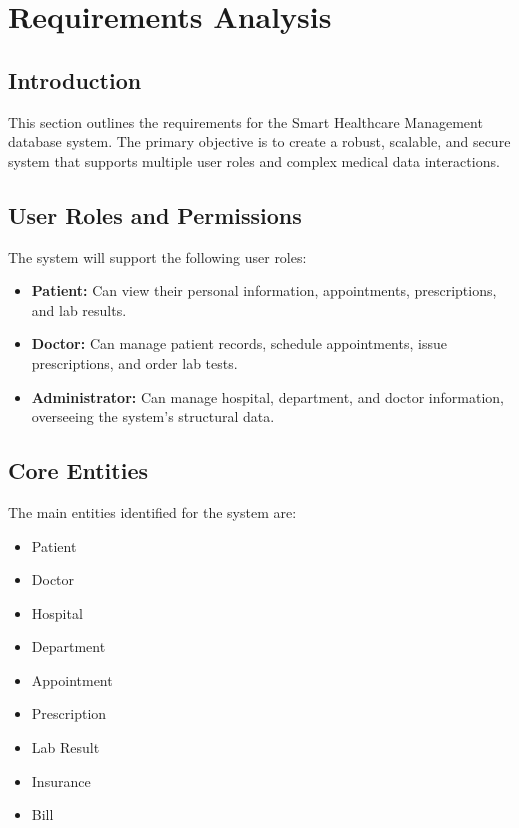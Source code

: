 \section{Requirements Analysis}

\subsection{Introduction}
This section outlines the requirements for the Smart Healthcare Management database system. The primary objective is to create a robust, scalable, and secure system that supports multiple user roles and complex medical data interactions.

\subsection{User Roles and Permissions}
The system will support the following user roles:
\begin{itemize}
    \item \textbf{Patient:} Can view their personal information, appointments, prescriptions, and lab results.
    \item \textbf{Doctor:} Can manage patient records, schedule appointments, issue prescriptions, and order lab tests.
    \item \textbf{Administrator:} Can manage hospital, department, and doctor information, overseeing the system's structural data.
\end{itemize}

\subsection{Core Entities}
The main entities identified for the system are:
\begin{itemize}
    \item Patient
    \item Doctor
    \item Hospital
    \item Department
    \item Appointment
    \item Prescription
    \item Lab Result
    \item Insurance
    \item Bill
\end{itemize}

